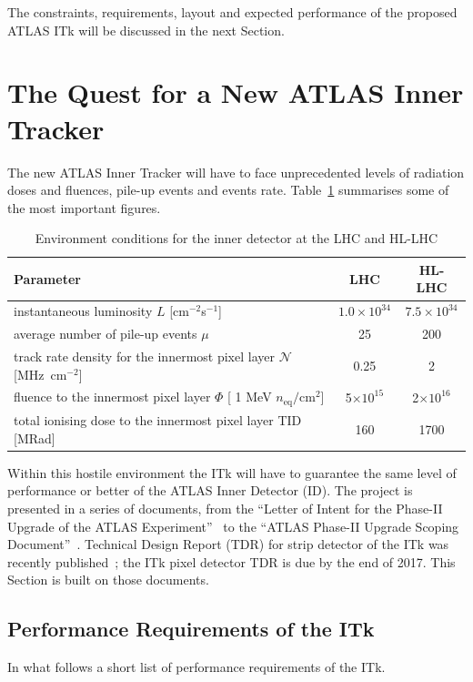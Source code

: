 The constraints, requirements, layout and expected performance of the proposed ATLAS ITk will 
be discussed in the next Section.

\section{The Quest for a New ATLAS Inner Tracker}
\label{sec:NewTracker}

The new ATLAS  Inner Tracker will have to face unprecedented levels of radiation doses and fluences, 
pile-up events and events rate. Table~\ref{tab:ITkConditions} summarises some of the most important figures.

\begin{table}[!htpb]
\centering
\caption{\label{tab:ITkConditions}Environment conditions for the inner detector at the LHC and HL-LHC}
\begin{tabular}{lcc}
\hline
Parameter & LHC & HL-LHC \\
\hline
\hline
instantaneous luminosity $L$	 [cm$^{-2}$s$^{-1}$] & $1.0\times10^{34}$ &  $7.5\times10^{34}$ \\
average number of pile-up events $\mu$ & 25 & 200\\
track rate density for the innermost pixel layer $\mathcal{N}$ [MHz~cm$^{-2}$] & 0.25 & 2 \\ 
fluence to the innermost pixel layer $\Phi$ [ 1 MeV $n_\text{eq}/\text{cm}^2$] & 5$\times10^{15}$ & 2$\times10^{16}$ \\
total ionising dose to the innermost pixel layer TID [MRad] & 160  & 1700 \\
\hline
\end{tabular}
\end{table}

Within this hostile environment the ITk will have to guarantee the same level of performance  or better 
of the ATLAS Inner Detector (ID).
The project is presented  in a series of documents, from the ``Letter of Intent for the Phase-II Upgrade of the ATLAS Experiment''~\cite{ATLASLoIPhaseII} to the ``ATLAS Phase-II Upgrade Scoping Document''~\cite{ATLASITkScopingDocument}. Technical Design Report (TDR) for strip detector of the 
ITk was recently published~\cite{ITkStripsTDR}; the ITk pixel detector TDR is due by the end of 2017.
This Section is built on those documents.




\subsection{Performance Requirements of the ITk}
In what follows a short list of performance requirements of the ITk.

